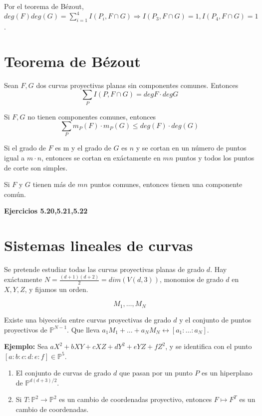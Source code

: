 Por el teorema de Bézout, $deg(F)deg(G)=\sum_{i=1}^4I(P_i,F\cap G) \Rightarrow I(P_3,F\cap G)=1, I(P_4,F\cap G)=1$. 

\section{Teorema de Bézout}
\begin{Teo}
Sean $F,G$ dos curvas proyectivas planas sin componentes comunes. Entonces 
$$\sum_P I(P,F\cap G)=degF \cdot degG$$
\end{Teo}

\begin{Cor}
Si $F,G$ no tienen componentes comunes, entonces
$$\sum_P m_P(F)\cdot m_P(G) \le deg(F)\cdot deg(G) $$
\end{Cor}

\begin{Cor}
Si el grado de $F$ es m y el grado de $G$ es $n$ y se cortan en un número de puntos igual a $m\cdot n$, entonces se cortan en exáctamente en $mn$ puntos y todos los puntos de corte son simples. 
\end{Cor}

\begin{Cor}
Si $F$ y $G$ tienen más de $mn$ puntos comunes, entonces tienen una componente común. 
\end{Cor}

\textbf{Ejercicios 5.20,5.21,5.22}

\section{Sistemas lineales de curvas}

Se pretende estudiar todas las curvas proyectivas planas de grado $d$. Hay exáctamente $N=\frac{(d+1)(d+2)}{2}=dim(V(d,3))$, monomios de grado $d$ en $X,Y,Z$, y fijamos un orden.

$$M_1,\dots , M_N$$

\begin{nota}
Existe una biyección entre curvas proyectivas de grado $d$ y el conjunto de puntos proyectivos de $\mathbb{P}^{N-1}$. Que lleva $a_1M_1+\dots +a_NM_N \leftrightarrow [a_1:\dots :a_N]$. 
\end{nota}

\textbf{Ejemplo:} Sea $aX^2+bXY+cXZ+dY^2+eYZ+fZ^2$, y se identifica con el punto $[a:b:c:d:e:f]\in \mathbb{P}^5$. 

\begin{Lem}
\begin{enumerate}
\item El conjunto de curvas de grado $d$ que pasan por un punto $P$ es un hiperplano de $\mathbb{P}^{d(d+3)/2}$.
\item Si $T:\mathbb{P}^2\rightarrow \mathbb{P}^2$ es un cambio de coordenadas proyectivo, entonces $F\mapsto F^T$ es un cambio de coordenadas. 
\end{enumerate}
\end{Lem}

